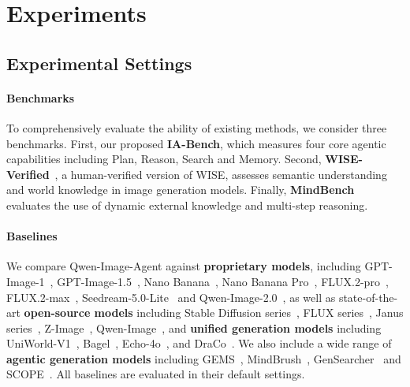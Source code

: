 \section{Experiments}

\subsection{Experimental Settings}

\paragraph{Benchmarks}
To comprehensively evaluate the ability of existing methods, we consider three benchmarks. First, our proposed \textbf{IA-Bench}, which measures four core agentic capabilities including Plan, Reason, Search and Memory. Second, \textbf{WISE-Verified}~\citep{Niu2025WISEAW}, a human-verified version of WISE, assesses semantic understanding and world knowledge in image generation models. Finally, \textbf{MindBench}~\citep{He2026MindBrushIA} evaluates the use of dynamic external knowledge and multi-step reasoning.
\paragraph{Baselines} We compare Qwen-Image-Agent against \textbf{proprietary models}, including GPT-Image-1~\citep{openai2024gptimage1}, GPT-Image-1.5~\citep{openai2025gptimage15}, Nano Banana~\citep{deepmind2024geminiimage25}, Nano Banana Pro~\citep{deepmind2024geminiimage}, FLUX.2-pro~\citep{blackforestlabs2026flux2pro}, FLUX.2-max~\citep{blackforestlabs2026flux2max}, Seedream-5.0-Lite~\citep{bytedance_seedream5_lite_2025} and Qwen-Image-2.0~\citep{Zhao2026QwenImage20TR}, as well as state-of-the-art \textbf{open-source models} including Stable Diffusion series~\citep{podell2023sdxl, rombach2022high, sd3Medium, sd35Medium, sd35Large}, FLUX series~\citep{flux2024, labs2025flux1kontextflowmatching, blackforestlabs2026flux2pro}, Janus series~\citep{wu2024janus, chen2025janus}, Z-Image~\citep{cai2025z}, Qwen-Image~\citep{wu2025qwen}, and \textbf{unified generation models} including UniWorld-V1~\citep{lin2025uniworld}, Bagel~\citep{deng2025bagel}, Echo-4o~\citep{ye2025echo}, and DraCo~\citep{jiang2025draco}. We also include a wide range of \textbf{agentic generation models} including GEMS~\citep{He2026GEMSAM}, MindBrush~\citep{He2026MindBrushIA}, GenSearcher~\citep{Feng2026GenSearcherRA} and SCOPE~\citep{Ren2026SCOPESD}. All baselines are evaluated in their default settings. 



